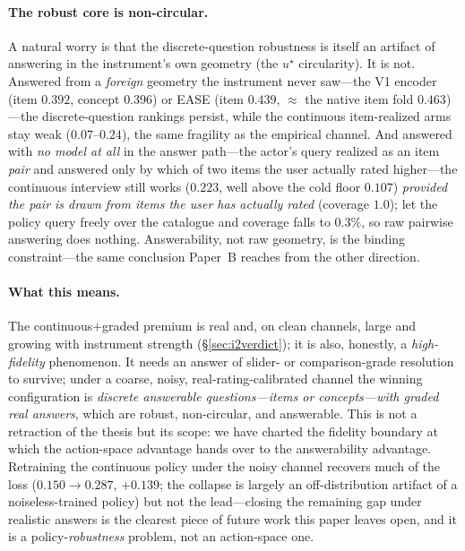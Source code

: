 \documentclass[11pt]{article}
\begin{document}
\paragraph{The robust core is non-circular.} A natural worry is that the discrete-question robustness is itself an
artifact of answering in the instrument's own geometry (the $u^\star$ circularity). It is not. Answered from a
\emph{foreign} geometry the instrument never saw---the V1 encoder (item $0.392$, concept $0.396$) or EASE (item $0.439$,
${\approx}$ the native item fold $0.463$)---the discrete-question rankings persist, while the continuous item-realized
arms stay weak ($0.07$--$0.24$), the same fragility as the empirical channel. And answered with \emph{no model at all} in
the answer path---the actor's query realized as an item \emph{pair} and answered only by which of two items the user
actually rated higher---the continuous interview still works ($0.223$, well above the cold floor $0.107$) \emph{provided
the pair is drawn from items the user has actually rated} (coverage $1.0$); let the policy query freely over the
catalogue and coverage falls to $0.3\%$, so raw pairwise answering does nothing. Answerability, not raw geometry, is the
binding constraint---the same conclusion Paper~B reaches from the other direction.

\paragraph{What this means.} The continuous$+$graded premium is real and, on clean channels, large and growing with
instrument strength (\S\ref{sec:i2verdict}); it is also, honestly, a \emph{high-fidelity} phenomenon. It needs an answer
of slider- or comparison-grade resolution to survive; under a coarse, noisy, real-rating-calibrated channel the winning
configuration is \emph{discrete answerable questions---items or concepts---with graded real answers}, which are robust,
non-circular, and answerable. This is not a retraction of the thesis but its scope: we have charted the fidelity boundary
at which the action-space advantage hands over to the answerability advantage. Retraining the continuous policy under the
noisy channel recovers much of the loss ($0.150\to0.287$, $+0.139$; the collapse is largely an off-distribution artifact
of a noiseless-trained policy) but not the lead---closing the remaining gap under realistic answers is the clearest piece
of future work this paper leaves open, and it is a policy-\emph{robustness} problem, not an action-space one.
\end{document}
